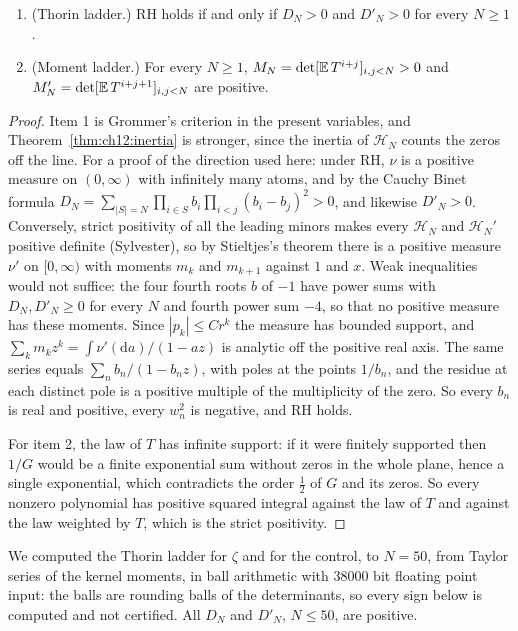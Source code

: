 \begin{proposition}\label{c:prop:grommer}
\begin{enumerate}
\item (Thorin ladder.) RH holds if and only if $D_N>0$ and $D'_N>0$ for every $N\ge1$.
\item (Moment ladder.) For every $N\ge1$, $M_N=\det[\mathbb{E}\,T^{i+j}]_{i,j<N}>0$ and $M'_N=\det[\mathbb{E}\,T^{i+j+1}]_{i,j<N}$ are positive.
\end{enumerate}
\end{proposition}

\begin{proof}
Item 1 is Grommer's criterion \cite{Grommer14} in the present variables, and Theorem~\ref{thm:ch12:inertia} is stronger, since the inertia of $\mathcal H_N$ counts the zeros off the line. For a proof of the direction used here: under RH, $\nu$ is a positive measure on $(0,\infty)$ with infinitely many atoms, and by the Cauchy Binet formula $D_N=\sum_{|S|=N}\prod_{i\in S}b_i\prod_{i<j}(b_i-b_j)^2>0$, and likewise $D'_N>0$. Conversely, strict positivity of all the leading minors makes every $\mathcal H_N$ and $\mathcal H_N'$ positive definite (Sylvester), so by Stieltjes's theorem there is a positive measure $\nu'$ on $[0,\infty)$ with moments $m_{k}$ and $m_{k+1}$ against $1$ and $x$. Weak inequalities would not suffice: the four fourth roots $b$ of $-1$ have power sums with $D_N,D'_N\ge0$ for every $N$ and fourth power sum $-4$, so that no positive measure has these moments. Since $|p_k|\le Cr^k$ the measure has bounded support, and $\sum_km_kz^k=\int\nu'(\mathrm da)/(1-az)$ is analytic off the positive real axis. The same series equals $\sum_nb_n/(1-b_nz)$, with poles at the points $1/b_n$, and the residue at each distinct pole is a positive multiple of the multiplicity of the zero. So every $b_n$ is real and positive, every $w_n^2$ is negative, and RH holds.

For item 2, the law of $T$ has infinite support: if it were finitely supported then $1/G$ would be a finite exponential sum without zeros in the whole plane, hence a single exponential, which contradicts the order $\frac12$ of $G$ and its zeros. So every nonzero polynomial has positive squared integral against the law of $T$ and against the law weighted by $T$, which is the strict positivity.
\end{proof}

We computed the Thorin ladder for $\zeta$ and for the control, to $N=50$, from Taylor series of the kernel moments, in ball arithmetic with $38000$ bit floating point input: the balls are rounding balls of the determinants, so every sign below is computed and not certified. All $D_N$ and $D'_N$, $N\le50$, are positive.

